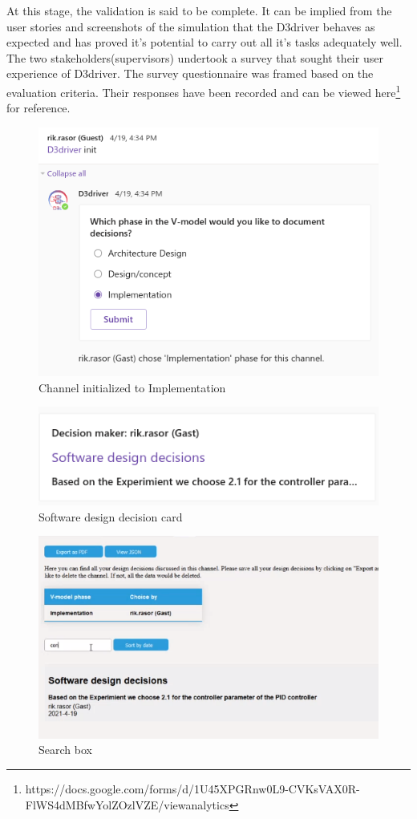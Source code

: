 \begin{enumerate}
At this stage, the validation is said to be complete. It can be implied from the user stories and screenshots of the simulation that the D3driver behaves as expected and has proved it's potential to carry out all it's tasks adequately well. The two stakeholders(supervisors) undertook a survey that sought their user experience of D3driver. The survey questionnaire was framed based on the evaluation criteria. Their responses have been recorded and can be viewed here\footnote{https://docs.google.com/forms/d/1U45XPGRnw0L9-CVKsVAX0R-FlWS4dMBfwYolZOzlVZE/viewanalytics} for reference.

\begin{figure}
\centering
\includegraphics[width=0.7\linewidth]{figures/impleinit}
\caption{Channel initialized to Implementation}
\label{fig:impleinit}
\end{figure}


\begin{figure}
\centering
\includegraphics[width=0.7\linewidth]{"figures/software design decision"}
\caption{Software design decision card}
\label{fig:software-design-decision}
\end{figure}


\begin{figure}
\centering
\includegraphics[width=0.7\linewidth]{"figures/search button"}
\caption{Search box}
\label{fig:search-button}
\end{figure}


\end{enumerate}
